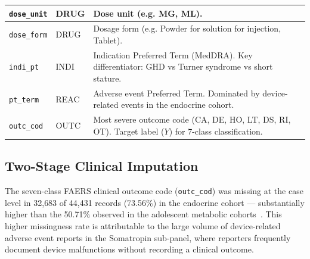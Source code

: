 \documentclass[10pt,twocolumn]{article}
\newcommand{\FAERS}{\textsf{FAERS}\xspace}
\begin{document}
\begin{table}[htbp]
\begin{tabularx}{\textwidth}{|l|l|p{10.5cm}|}
\hline
\rowcolor{rowB} \texttt{dose\_unit} & DRUG & Dose unit (e.g. MG, ML). \\
\hline
\rowcolor{rowA} \texttt{dose\_form} & DRUG & Dosage form (e.g. Powder for solution for injection, Tablet). \\
\hline
\rowcolor{rowB} \texttt{indi\_pt} & INDI & Indication Preferred Term (MedDRA). Key differentiator: GHD vs Turner syndrome vs short stature. \\
\hline
\rowcolor{rowA} \texttt{pt\_term} & REAC & Adverse event Preferred Term. Dominated by device-related events in the endocrine cohort. \\
\hline
\rowcolor{rowB} \texttt{outc\_cod} & OUTC & Most severe outcome code (CA, DE, HO, LT, DS, RI, OT). Target label ($Y$) for 7-class classification. \\
\hline
\end{tabularx}
\end{table}
 
\subsection{Two-Stage Clinical Imputation}
\label{sec:imputation}
 
The seven-class \FAERS clinical outcome code (\texttt{outc\_cod}) was missing at the case level in 32{,}683 of 44{,}431 records (73.56\%) in the endocrine cohort --- substantially higher than the 50.71\% observed in the adolescent metabolic cohorts~\cite{telkar2026obesity}. This higher missingness rate is attributable to the large volume of device-related adverse event reports in the Somatropin sub-panel, where reporters frequently document device malfunctions without recording a clinical outcome.
 
\end{document}
